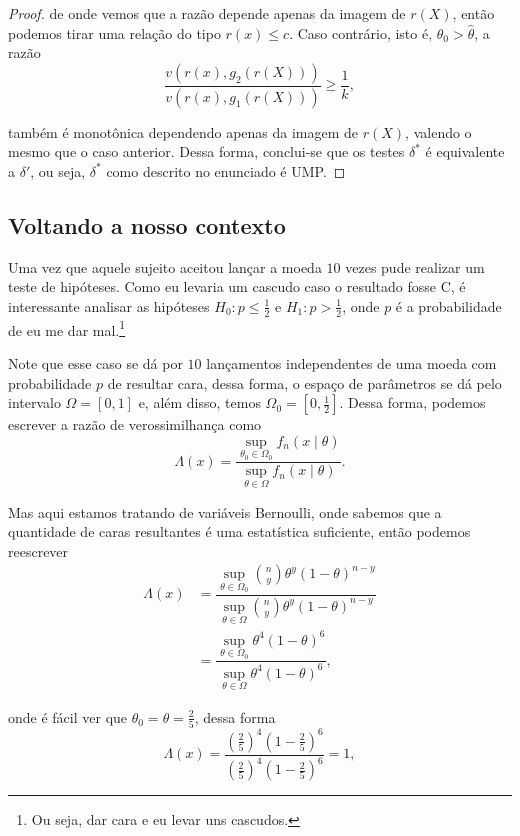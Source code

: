 \documentclass{article}
\begin{document}
\begin{proof}
    \noindent de onde vemos que a razão depende apenas da imagem de $r(X)$, então podemos tirar uma relação do tipo $r(x) \leq c$. Caso contrário, isto é, $\theta_0 > \hat{\theta}$, a razão
    \[\dfrac{v\left(r(x), g_2(r(X))\right)}{v\left(r(x), g_1(r(X))\right)} \geq \dfrac{1}{k},\]
    
    \noindent também é monotônica dependendo apenas da imagem de $r(X)$, valendo o mesmo que o caso anterior. Dessa forma, conclui-se que os testes $\delta^*$ é equivalente a $\delta'$, ou seja, $\delta^*$ como descrito no enunciado é UMP.
\end{proof}

\subsection*{Voltando a nosso contexto}

Uma vez que aquele sujeito aceitou lançar a moeda $10$ vezes pude realizar um teste de hipóteses. Como eu levaria um cascudo caso o resultado fosse C, é interessante analisar as hipóteses $H_0 : p \leq \frac{1}{2}$ e $H_1 : p > \frac{1}{2}$, onde $p$ é a probabilidade de eu me dar mal.\footnote{Ou seja, dar cara e eu levar uns cascudos.}

Note que esse caso se dá por $10$ lançamentos independentes de uma moeda com probabilidade $p$ de resultar cara, dessa forma, o espaço de parâmetros se dá pelo intervalo $\Omega = [0, 1]$ e, além disso, temos $\Omega_0 = \left[0, \frac{1}{2}\right]$. Dessa forma, podemos escrever a razão de verossimilhança como
\[\Lambda(x) = \dfrac{\sup_{\theta_0 \in \Omega_0} f_n(x \mid \theta)}{\sup_{\theta \in \Omega} f_n(x \mid \theta)}.\]

Mas aqui estamos tratando de variáveis Bernoulli, onde sabemos que a quantidade de caras resultantes é uma estatística suficiente, então podemos reescrever
\begin{equation*}
    \begin{split}
        \Lambda(x) & = \dfrac{\sup_{\theta \in \Omega_0} \binom{n}{y} \theta^y(1 - \theta)^{n - y}}{\sup_{\theta \in \Omega} \binom{n}{y} \theta^y(1 - \theta)^{n - y}} \\
        & = \dfrac{\sup_{\theta \in \Omega_0} \theta^4(1 - \theta)^6}{\sup_{\theta \in \Omega} \theta^4(1 - \theta)^6},
    \end{split}
\end{equation*}

\noindent onde é fácil ver que $\theta_0 = \theta = \frac{2}{5}$, dessa forma
\[\Lambda(x) = \dfrac{\left(\frac{2}{5}\right)^4\left(1 - \frac{2}{5}\right)^6}{\left(\frac{2}{5}\right)^4\left(1 - \frac{2}{5}\right)^6} = 1,\]
\end{document}
